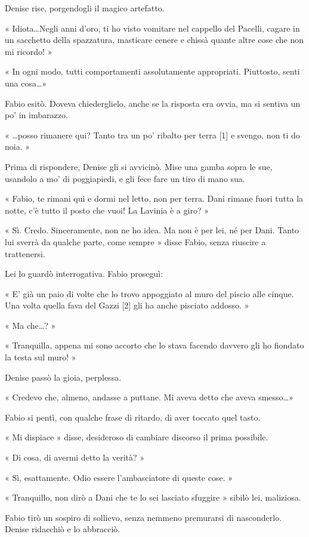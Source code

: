 Denise rise, porgendogli il magico artefatto.

« Idiota\ldots Negli anni d'oro, ti ho visto vomitare nel cappello del Pacelli, cagare in un sacchetto della spazzatura, masticare cenere e chissà quante altre cose che non mi ricordo! »

« In ogni modo, tutti comportamenti assolutamente appropriati. Piuttosto, senti una cosa\ldots »

Fabio esitò. Doveva chiederglielo, anche se la risposta era ovvia, ma si sentiva un po' in imbarazzo.

« \ldots posso rimanere qui? Tanto tra un po' ribalto per terra [1] e svengo, non ti do noia. »

Prima di rispondere, Denise gli si avvicinò. Mise una gamba sopra le sue, usandolo a mo' di poggiapiedi, e gli fece fare un tiro di mano sua.

« Fabio, te rimani qui e dormi nel letto, non per terra. Dani rimane fuori tutta la notte, c'è tutto il posto che vuoi! La Lavinia è a giro? »

« Sì. Credo. Sinceramente, non ne ho idea. Ma non è per lei, né per Dani. Tanto lui sverrà da qualche parte, come sempre » disse Fabio, senza riuscire a trattenersi.

Lei lo guardò interrogativa. Fabio proseguì:

« E' già un paio di volte che lo trovo appoggiato al muro del piscio alle cinque. Una volta quella fava del Gazzi [2] gli ha anche pisciato addosso. »

« Ma che\ldots? »

« Tranquilla, appena mi sono accorto che lo stava facendo davvero gli ho fiondato la testa sul muro! »

Denise passò la gioia, perplessa.

« Credevo che, almeno, andasse a puttane. Mi aveva detto che aveva smesso\ldots »

Fabio si pentì, con qualche frase di ritardo, di aver toccato quel tasto.

« Mi dispiace » disse, desideroso di cambiare discorso il prima possibile.

« Di cosa, di avermi detto la verità? »

« Sì, esattamente. Odio essere l'ambasciatore di queste cose. »

« Tranquillo, non dirò a Dani che te lo sei lasciato sfuggire » sibilò lei, maliziosa.

Fabio tirò un sospiro di sollievo, senza nemmeno premurarsi di nasconderlo. Denise ridacchiò e lo abbracciò.

